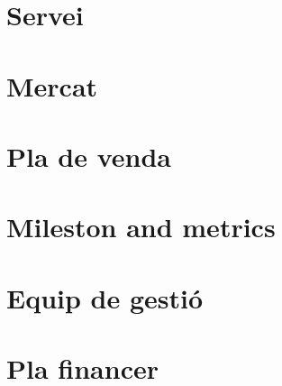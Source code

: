 \documentclass[12pt]{article}
\begin{document}
\section{Servei}
\clearpage
\section{Mercat}
\clearpage
\section{Pla de venda}
\clearpage
\section{Mileston and metrics}
\clearpage
\section{Equip de gestió}
\clearpage
\section{Pla financer}
\clearpage
\appendix
\end{document}
